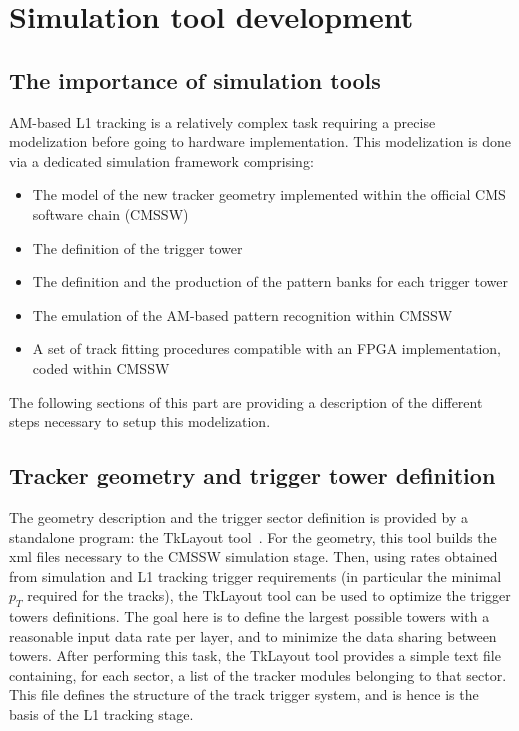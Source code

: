 \section{Simulation tool development}

\subsection{The importance of simulation tools}

\noindent AM-based L1 tracking is a relatively complex task requiring a precise modelization before going to hardware implementation. This modelization is done via a dedicated simulation framework comprising:

\begin{itemize}
\item The model of the new tracker geometry implemented within the official CMS software chain (CMSSW)
\item The definition of the trigger tower
\item The definition and the production of the pattern banks for each trigger tower
\item The emulation of the AM-based pattern recognition within CMSSW
\item A set of track fitting procedures compatible with an FPGA implementation, coded within CMSSW
\end{itemize}

\noindent The following sections of this part are providing a description of the different steps necessary to setup this modelization. 

\subsection{Tracker geometry and trigger tower definition}

\noindent The geometry description and the trigger sector definition is provided by a standalone program: the TkLayout tool~\cite{bib:TkLayout}. For the geometry, this tool builds the xml files necessary to the CMSSW simulation stage. Then, using rates obtained from simulation and L1 tracking trigger requirements (in particular the minimal $p_T$ required for the tracks), the TkLayout tool can be used to optimize the trigger towers definitions. The goal here is to define the largest possible towers with a reasonable input data rate per layer, and to minimize the data sharing between towers. After performing this task, the TkLayout tool provides a simple text file containing, for each sector, a list of the tracker modules belonging to that sector. This file defines the structure of the track trigger system, and is hence is the basis of the L1 tracking stage.
  
